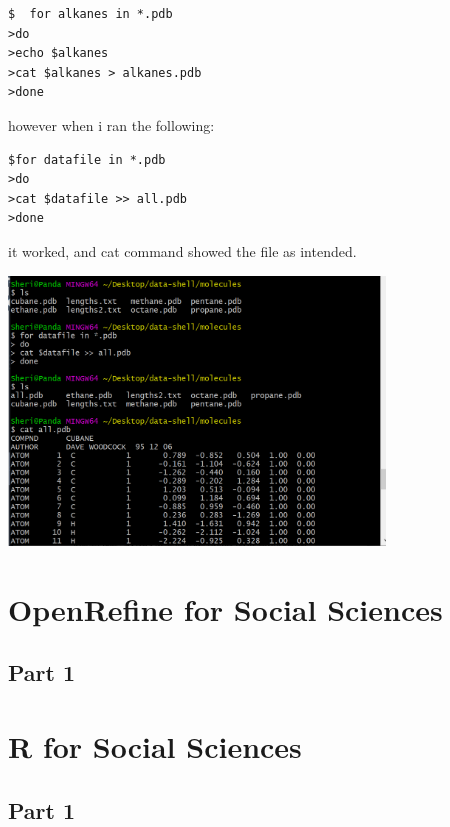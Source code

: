 \documentclass{article}
\begin{document}
\begin{verbatim}
$  for alkanes in *.pdb
>do
>echo $alkanes
>cat $alkanes > alkanes.pdb
>done
\end{verbatim}

however when i ran the following:

\begin{verbatim}
$for datafile in *.pdb
>do
>cat $datafile >> all.pdb
>done
\end{verbatim}

it worked, and cat command showed the file as intended.

\includegraphics[width=10cm]{Images/GitBash_047.PNG}



\section{OpenRefine for Social Sciences}
\subsection{Part 1}


\section{R for Social Sciences}
\subsection{Part 1}
\end{document}
